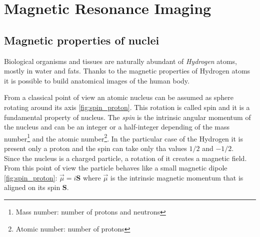 \section{Magnetic Resonance Imaging}
 \subsection{Magnetic properties of nuclei}
 Biological organisms and tissues are naturally abundant of \emph{Hydrogen} atoms, mostly in water and fats. Thanks to the magnetic properties of Hydrogen atoms it is possible to build anatomical images of the human body.

 From a classical point of view an atomic nucleus can be assumed as sphere rotating around its axis \ref{fig:spin_proton}. This rotation is called spin and it is a fundamental property of nucleus. The \emph{spin} is the intrinsic angular momentum of the nucleus and can be an integer or a half-integer depending of the mass number\footnote{Mass number: number of protons and neutrons} and the atomic number\footnote{Atomic number: number of protons}. In the particular case of the Hydrogen it is present only a proton and the spin can take only tha values $1/2$ and $-1/2$. \cite{slides} \\
 Since the nucleus is a charged particle, a rotation of it creates a magnetic field. From this point of view the particle behaves like a small magnetic dipole \ref{fig:spin_proton}: $ \vec{\mu} =i\mathbf{S}$ where $\vec{\mu}$ is the intrinsic magnetic momentum that is aligned on its spin $\mathbf{S}$.

